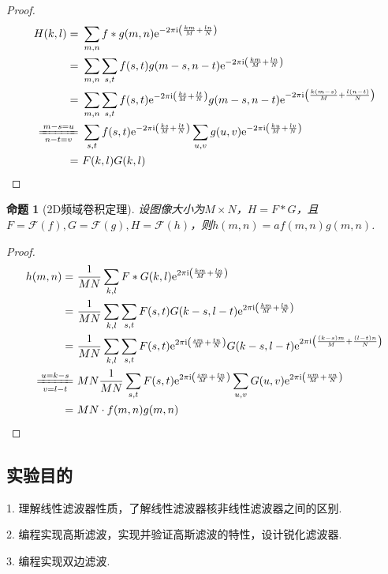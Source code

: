 \documentclass[12pt, a4paper, oneside]{ctexart}
\newtheorem{proposition}{命题}
\def\e{\mathrm{e}}          %
\def\i{\mathrm{i}}          %
\def\F{\mathcal{F}}          %
\begin{document}
\begin{proof}
    \begin{align*}
        H(k, l) =&\ \sum_{m,n}f*g(m, n)\e^{-2\pi\i\left(\frac{km}{M}+\frac{ln}{N}\right)}\\
        =&\ \sum_{m, n}\sum_{s, t}f(s,t)g(m-s,n-t)\e^{-2\pi\i\left(\frac{km}{M}+\frac{ln}{N}\right)}\\
        =&\ \sum_{m, n}\sum_{s, t}f(s,t)\e^{-2\pi\i\left(\frac{ks}{M}+\frac{lt}{N}\right)}g(m-s,n-t)\e^{-2\pi\i\left(\frac{k(m-s)}{M}+\frac{l(n-t)}{N}\right)}\\
        \xlongequal[n-t=v]{m-s = u}&\ \sum_{s,t}f(s,t)\e^{-2\pi\i\left(\frac{ks}{M}+\frac{lt}{N}\right)}\sum_{u,v}g(u,v)\e^{-2\pi\i\left(\frac{ku}{M}+\frac{lv}{N}\right)}\\
        =&\ F(k, l)G(k,l)
    \end{align*}
\end{proof}
\begin{proposition}[2D频域卷积定理]
    设图像大小为$M\times N$，$H = F*G$，且$F = \F(f), G = \F(g), H = \F(h)$，则$h(m,n) = af(m,n)g(m,n)$.
\end{proposition}
\begin{proof}
    \begin{align*}
        h(m, n) =&\ \frac{1}{MN}\sum_{k,l}F*G(k, l)\e^{2\pi\i\left(\frac{km}{M}+\frac{ln}{N}\right)}\\
        =&\ \frac{1}{MN}\sum_{k,l}\sum_{s,t}F(s,t)G(k-s,l-t)\e^{2\pi\i\left(\frac{km}{M}+\frac{ln}{N}\right)}\\
        =&\ \frac{1}{MN}\sum_{k,l}\sum_{s,t}F(s,t)\e^{2\pi\i\left(\frac{sm}{M}+\frac{tn}{N}\right)}G(k-s,l-t)\e^{2\pi\i\left(\frac{(k-s)m}{M}+\frac{(l-t)n}{N}\right)}\\
        \xlongequal[v=l-t]{u=k-s}&\ MN\frac{1}{MN}\sum_{s,t}F(s,t)\e^{2\pi\i\left(\frac{sm}{M}+\frac{tn}{N}\right)}\sum_{u,v}G(u,v)\e^{2\pi\i\left(\frac{um}{M}+\frac{vn}{N}\right)}\\
        =&\ MN\cdot f(m,n)g(m,n)
    \end{align*}
\end{proof}
\subsection{实验目的}
1. 理解线性滤波器性质，了解线性滤波器核非线性滤波器之间的区别.

2. 编程实现高斯滤波，实现并验证高斯滤波的特性，设计锐化滤波器.

3. 编程实现双边滤波.
\end{document}
